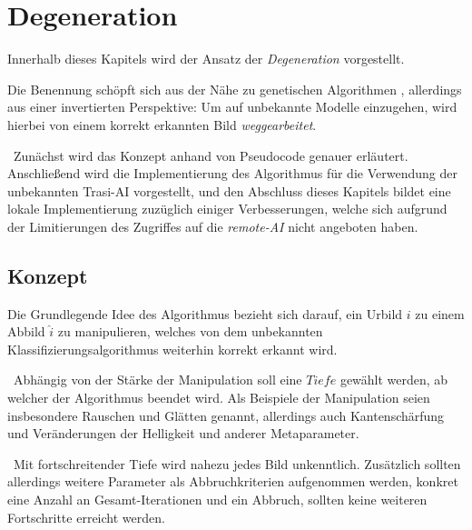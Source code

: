 \chapter{Degeneration}
Innerhalb dieses Kapitels wird der Ansatz der \textit{Degeneration} vorgestellt.

Die Benennung schöpft sich aus der Nähe zu genetischen Algorithmen , allerdings aus einer invertierten Perspektive: Um auf unbekannte Modelle einzugehen, wird hierbei von einem korrekt erkannten Bild \textit{weggearbeitet}.

~\newline Zunächst wird das Konzept anhand von Pseudocode genauer erläutert. Anschließend wird die Implementierung des Algorithmus für die Verwendung der unbekannten Trasi-AI vorgestellt, und den Abschluss dieses Kapitels bildet eine lokale Implementierung zuzüglich einiger Verbesserungen, welche sich aufgrund der Limitierungen des Zugriffes auf die \textit{remote-AI} nicht angeboten haben.
\section{Konzept}
Die Grundlegende Idee des Algorithmus bezieht sich darauf, ein Urbild $i$ zu einem Abbild $\hat{i}$ zu manipulieren, welches von dem unbekannten Klassifizierungsalgorithmus weiterhin korrekt erkannt wird. 

~\newline Abhängig von der Stärke der Manipulation soll eine $Tiefe$ gewählt werden, ab welcher der Algorithmus beendet wird. Als Beispiele der Manipulation seien insbesondere Rauschen und Glätten genannt, allerdings auch Kantenschärfung und Veränderungen der Helligkeit und anderer Metaparameter. 

~\newline Mit fortschreitender Tiefe wird nahezu jedes Bild unkenntlich. Zusätzlich sollten allerdings weitere Parameter als Abbruchkriterien aufgenommen werden, konkret eine Anzahl an Gesamt-Iterationen und ein Abbruch, sollten keine weiteren Fortschritte erreicht werden.

\newpage

